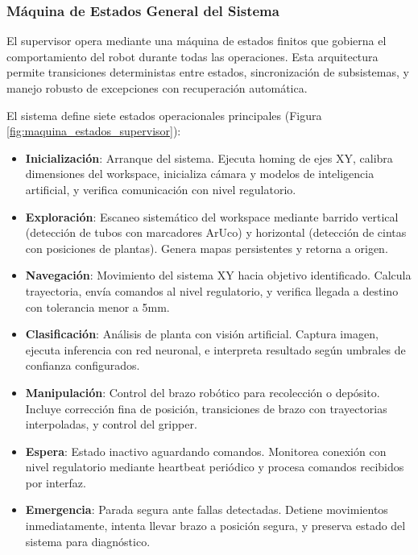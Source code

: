 \subsubsection{Máquina de Estados General del Sistema}

El supervisor opera mediante una máquina de estados finitos que gobierna el comportamiento del robot durante todas las operaciones. Esta arquitectura permite transiciones deterministas entre estados, sincronización de subsistemas, y manejo robusto de excepciones con recuperación automática.

El sistema define siete estados operacionales principales (Figura \ref{fig:maquina_estados_supervisor}):

\begin{itemize}
    \item \textbf{Inicialización}: Arranque del sistema. Ejecuta homing de ejes XY, calibra dimensiones del workspace, inicializa cámara y modelos de inteligencia artificial, y verifica comunicación con nivel regulatorio.

    \item \textbf{Exploración}: Escaneo sistemático del workspace mediante barrido vertical (detección de tubos con marcadores ArUco) y horizontal (detección de cintas con posiciones de plantas). Genera mapas persistentes y retorna a origen.

    \item \textbf{Navegación}: Movimiento del sistema XY hacia objetivo identificado. Calcula trayectoria, envía comandos al nivel regulatorio, y verifica llegada a destino con tolerancia menor a 5mm.

    \item \textbf{Clasificación}: Análisis de planta con visión artificial. Captura imagen, ejecuta inferencia con red neuronal, e interpreta resultado según umbrales de confianza configurados.

    \item \textbf{Manipulación}: Control del brazo robótico para recolección o depósito. Incluye corrección fina de posición, transiciones de brazo con trayectorias interpoladas, y control del gripper.

    \item \textbf{Espera}: Estado inactivo aguardando comandos. Monitorea conexión con nivel regulatorio mediante heartbeat periódico y procesa comandos recibidos por interfaz.

    \item \textbf{Emergencia}: Parada segura ante fallas detectadas. Detiene movimientos inmediatamente, intenta llevar brazo a posición segura, y preserva estado del sistema para diagnóstico.
\end{itemize}

